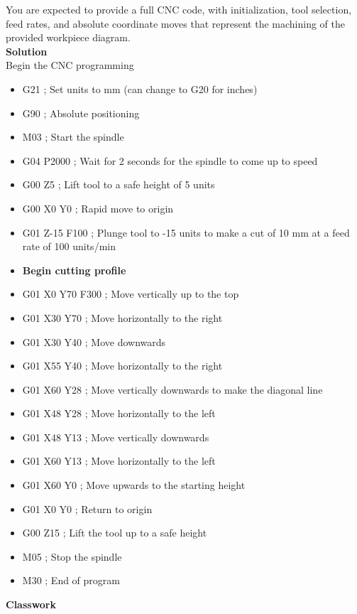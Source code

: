 \documentclass{article}
\begin{document}
You are expected to provide a full CNC code, with initialization, tool selection, feed rates, and absolute coordinate moves that represent the machining of the provided workpiece diagram.\\

\textbf{Solution}\\
Begin the CNC programming
\begin{itemize}
\item G21 ; Set units to mm (can change to G20 for inches)
\item G90 ; Absolute positioning

\item M03 ; Start the spindle
\item G04 P2000 ; Wait for 2 seconds for the spindle to come up to speed

\item G00 Z5 ; Lift tool to a safe height of 5 units
\item G00 X0 Y0 ; Rapid move to origin

\item G01 Z-15 F100 ; Plunge tool to -15 units to make a cut of 10 mm at a feed rate of 100 units/min
\item \textbf{Begin cutting profile}
\item G01 X0 Y70 F300 ; Move vertically up to the top
\item G01 X30 Y70 ; Move horizontally to the right
\item G01 X30 Y40 ; Move downwards
\item G01 X55 Y40 ; Move horizontally to the right
\item G01 X60 Y28 ; Move vertically downwards to make the diagonal line
\item G01 X48 Y28 ; Move horizontally to the left
\item G01 X48 Y13 ; Move vertically downwards
\item G01 X60 Y13 ; Move horizontally to the left
\item G01 X60 Y0 ; Move upwards to the starting height
\item G01 X0 Y0 ; Return to origin

\item G00 Z15 ; Lift the tool up to a safe height

\item M05 ; Stop the spindle
\item M30 ; End of program

\end{itemize}
\maketitle
\textbf{Classwork}
\end{document}
